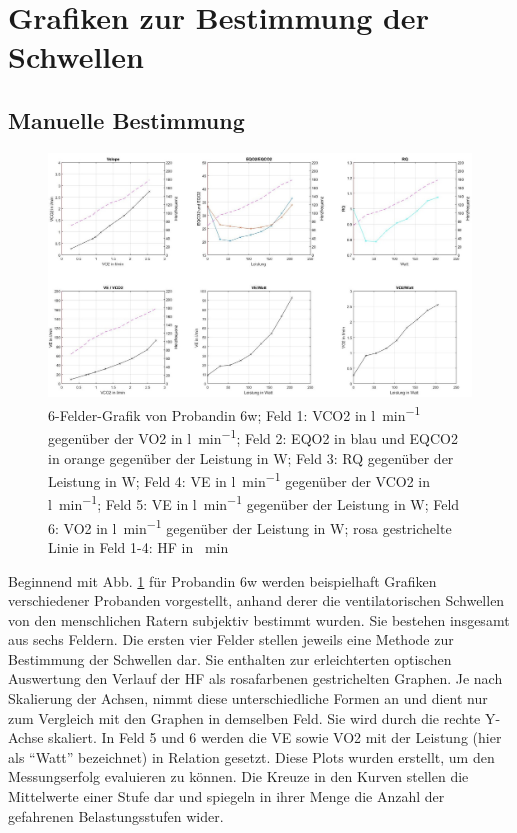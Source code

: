 \section{Grafiken zur Bestimmung der Schwellen}
%
\subsection{Manuelle Bestimmung}
%
\begin{figure}[H]
	\centering
	\includegraphics[width=\textwidth]{Bilder/plot_6w.jpg}
	\caption[6-Felder-Grafik von Probandin 6w]{6-Felder-Grafik von Probandin 6w; Feld 1: \gls{VCO2} in \si{\litre\per\minute} gegenüber der \gls{VO2} in \si{\litre\per\minute}; Feld 2: \gls{EQO2} in blau und \gls{EQCO2} in orange gegenüber der Leistung in \si{\watt}; Feld 3: \gls{RQ} gegenüber der Leistung in \si{\watt}; Feld 4: \gls{VE} in \si{\litre\per\minute} gegenüber der \gls{VCO2} in \si{\litre\per\minute}; Feld 5: \gls{VE} in \si{\litre\per\minute} gegenüber der Leistung in \si{\watt}; Feld 6: \gls{VO2} in \si{\litre\per\minute} gegenüber der Leistung in \si{\watt}; rosa gestrichelte Linie in Feld 1-4: \gls{HF} in \si{\per\minute}}
	\label{pic:pic15}
\end{figure}
%
Beginnend mit Abb. \ref{pic:pic15} für Probandin 6w werden beispielhaft Grafiken verschiedener Probanden vorgestellt, anhand derer die ventilatorischen Schwellen von den menschlichen Ratern subjektiv bestimmt wurden. Sie bestehen insgesamt aus sechs Feldern. Die ersten vier Felder stellen jeweils eine Methode zur Bestimmung der Schwellen dar. Sie enthalten zur erleichterten optischen Auswertung den Verlauf der \gls{HF} als rosafarbenen gestrichelten Graphen. Je nach Skalierung der Achsen, nimmt diese unterschiedliche Formen an und dient nur zum Vergleich mit den Graphen in demselben Feld. Sie wird durch die rechte Y-Achse skaliert. In Feld 5 und 6 werden die \gls{VE} sowie \gls{VO2} mit der Leistung (hier als "`Watt"' bezeichnet) in Relation gesetzt. Diese Plots wurden erstellt, um den Messungserfolg evaluieren zu können. Die Kreuze in den Kurven stellen die Mittelwerte einer Stufe dar und spiegeln in ihrer Menge die Anzahl der gefahrenen Belastungsstufen wider.
